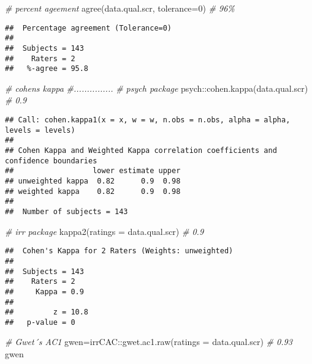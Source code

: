\documentclass[
  man]{apa6}
\newenvironment{Shaded}{\begin{snugshade}}{\end{snugshade}}
\newcommand{\AttributeTok}[1]{\textcolor[rgb]{0.77,0.63,0.00}{#1}}
\newcommand{\CommentTok}[1]{\textcolor[rgb]{0.56,0.35,0.01}{\textit{#1}}}
\newcommand{\DecValTok}[1]{\textcolor[rgb]{0.00,0.00,0.81}{#1}}
\newcommand{\FunctionTok}[1]{\textcolor[rgb]{0.00,0.00,0.00}{#1}}
\newcommand{\NormalTok}[1]{#1}
\newcommand{\OtherTok}[1]{\textcolor[rgb]{0.56,0.35,0.01}{#1}}
\newcommand{\SpecialCharTok}[1]{\textcolor[rgb]{0.00,0.00,0.00}{#1}}
\begin{document}
\begin{Shaded}
\begin{Highlighting}[]
\CommentTok{\# percent ageement}
\FunctionTok{agree}\NormalTok{(data.qual.scr, }\AttributeTok{tolerance=}\DecValTok{0}\NormalTok{) }\CommentTok{\# 96\%}
\end{Highlighting}
\end{Shaded}

\begin{verbatim}
##  Percentage agreement (Tolerance=0)
## 
##  Subjects = 143 
##    Raters = 2 
##   %-agree = 95.8
\end{verbatim}

\begin{Shaded}
\begin{Highlighting}[]
\CommentTok{\# cohens kappa}
\CommentTok{\#...............}
\CommentTok{\# psych package}
\NormalTok{psych}\SpecialCharTok{::}\FunctionTok{cohen.kappa}\NormalTok{(data.qual.scr) }\CommentTok{\# 0.9}
\end{Highlighting}
\end{Shaded}

\begin{verbatim}
## Call: cohen.kappa1(x = x, w = w, n.obs = n.obs, alpha = alpha, levels = levels)
## 
## Cohen Kappa and Weighted Kappa correlation coefficients and confidence boundaries 
##                  lower estimate upper
## unweighted kappa  0.82      0.9  0.98
## weighted kappa    0.82      0.9  0.98
## 
##  Number of subjects = 143
\end{verbatim}

\begin{Shaded}
\begin{Highlighting}[]
\CommentTok{\# irr package}
\FunctionTok{kappa2}\NormalTok{(}\AttributeTok{ratings =}\NormalTok{ data.qual.scr) }\CommentTok{\# 0.9}
\end{Highlighting}
\end{Shaded}

\begin{verbatim}
##  Cohen's Kappa for 2 Raters (Weights: unweighted)
## 
##  Subjects = 143 
##    Raters = 2 
##     Kappa = 0.9 
## 
##         z = 10.8 
##   p-value = 0
\end{verbatim}

\begin{Shaded}
\begin{Highlighting}[]
\CommentTok{\# Gwet´s AC1}
\NormalTok{gwen}\OtherTok{=}\NormalTok{irrCAC}\SpecialCharTok{::}\FunctionTok{gwet.ac1.raw}\NormalTok{(}\AttributeTok{ratings =}\NormalTok{ data.qual.scr) }\CommentTok{\# 0.93}
\NormalTok{gwen}
\end{Highlighting}
\end{Shaded}
\end{document}
